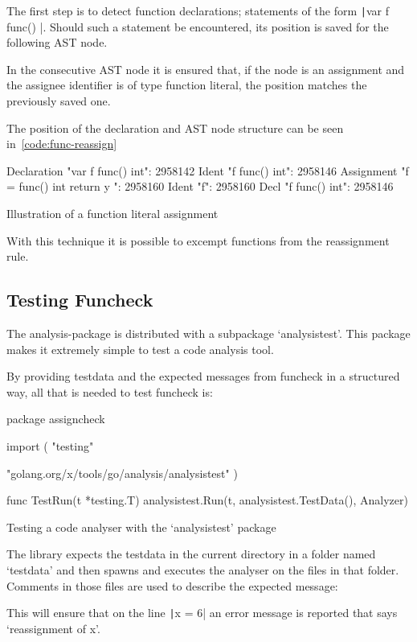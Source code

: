 The first step is to detect function declarations; statements of the form
\texttt|var f func() |. Should such a statement be encountered,
its position is saved for the following AST node.

In the consecutive AST node it is ensured that, if the node is an assignment and
the assignee identifier is of type function literal, the position matches the
previously saved one.

The position of the declaration and AST node structure can be seen in~\ref{code:func-reassign}

\begin{listing}
    \begin{gocode}
Declaration "var f func() int": 2958142
        Ident "f func() int": 2958146
Assignment "f = func() int { return y }": 2958160
        Ident "f": 2958160
                Decl "f func() int": 2958146
\end{gocode}
	\caption{Illustration of a function literal assignment\autocite{ast-positions}\label{code:func-reassign}}
\end{listing}

With this technique it is possible to excempt functions from the reassignment rule.

\subsection{Testing Funcheck}

The analysis-package is distributed with a subpackage `analysistest'. This package makes
it extremely simple to test a code analysis tool.

By providing testdata and the expected messages from funcheck in a structured way, all
that is needed to test funcheck is:

\begin{code}
\begin{gocode}
package assigncheck

import (
        "testing"

        "golang.org/x/tools/go/analysis/analysistest"
)

func TestRun(t *testing.T) {
        analysistest.Run(t, analysistest.TestData(), Analyzer)
}
\end{gocode}
    \caption{Testing a code analyser with the `analysistest' package}
\end{code}

The library expects the testdata in the current directory in a folder named `testdata' and
then spawns and executes the analyser on the files in that folder. Comments in those files
are used to describe the expected message:


This will ensure that on the line \texttt|x = 6| an error message is reported that says
`reassignment of x'.
